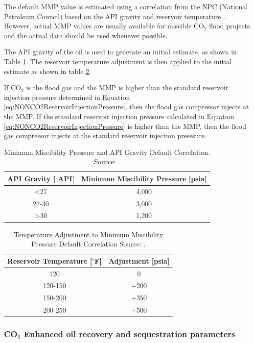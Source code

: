 \documentclass[11pt]{report}
\begin{document}
The default MMP value is estimated using a correlation from the NPC (National Petroleum Council) based on the API gravity and reservoir temperature \cite{NPC1976}. However, actual MMP values are usually available for miscible CO$_2$ flood projects and the actual data should be used whenever possible. 

The API gravity of the oil is used to generate an initial estimate, as shown in Table \ref{tab:InitialMMPCorrelation}. The reservoir temperature adjustment is then applied to the initial estimate as shown in table \ref{tab:MMPCorrelationTempAdjust}.

If CO$_2$ is the flood gas and the MMP is higher than the standard reservoir injection pressure determined in Equation \eqref{eq:NONCO2ReservoirInjectionPressure}, then the flood gas compressor injects at the MMP. If the standard reservoir injection pressure calculated in Equation \eqref{eq:NONCO2ReservoirInjectionPressure} is higher than the MMP, then the flood gas compressor injects at the standard reservoir injection presssure.

\begin{table}
\begin{scriptsize}
\caption{Minimum Miscibility Pressure and API Gravity Default Correlation. Source: \cite{NPC1976}.}
\label{tab:InitialMMPCorrelation}
\begin{tabular}{cc}
\toprule
API Gravity {[}$^{\circ}$API{]} & Minimum Miscibility Pressure {[}psia{]}\tabularnewline
\midrule
<27 & 4,000\tabularnewline
27-30 & 3,000\tabularnewline
>30 & 1,200\tabularnewline
\bottomrule
\end{tabular}
\end{scriptsize}
\end{table}

\begin{table}
\begin{scriptsize}
\caption{Temperature Adjustment to Minimum Miscibility Pressure Default Correlation Source: \cite{NPC1976}.}
\label{tab:MMPCorrelationTempAdjust}
\begin{tabular}{cc}
\toprule
Reservoir Temperature {[}$^{\circ}$F{]} & Adjustment {[}psia{]}\tabularnewline
\midrule
120 & 0\tabularnewline
120-150 & +200\tabularnewline
150-200 & +350\tabularnewline
200-250 & +500\tabularnewline
\bottomrule
\end{tabular}
\end{scriptsize}
\end{table}

\subsubsection{CO$_2$ Enhanced oil recovery and sequestration parameters}\label{sec:Sequestration}
\end{document}
